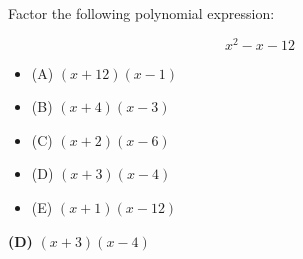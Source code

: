 

Factor the following polynomial expression:

$$x^2 - x - 12$$

\begin{itemize}
\item{(A)} $(x + 12)(x - 1)$
\vskip 5pt 
\item{(B)} $(x + 4)(x - 3)$
\vskip 5pt 
\item{(C)} $(x + 2)(x - 6)$
\vskip 5pt 
\item{(D)} $(x + 3)(x - 4)$
\vskip 5pt 
\item{(E)} $(x + 1)(x - 12)$
\end{itemize}







{\bf (D)} $(x + 3)(x - 4)$










